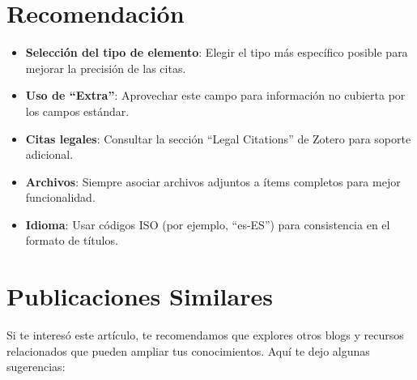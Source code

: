\documentclass[
  jou,
  floatsintext,
  longtable,
  a4paper,
  nolmodern,
  notxfonts,
  notimes,
  12pt,
  colorlinks=true,linkcolor=blue,citecolor=blue,urlcolor=blue]{apa7}
\providecommand{\tightlist}{%
  \setlength{\itemsep}{0pt}\setlength{\parskip}{0pt}}
\begin{document}
\section{Recomendación}\label{recomendaciuxf3n}

\begin{itemize}
\tightlist
\item
  \textbf{Selección del tipo de elemento}: Elegir el tipo más específico
  posible para mejorar la precisión de las citas.
\item
  \textbf{Uso de ``Extra''}: Aprovechar este campo para información no
  cubierta por los campos estándar.
\item
  \textbf{Citas legales}: Consultar la sección ``Legal Citations'' de
  Zotero para soporte adicional.
\item
  \textbf{Archivos}: Siempre asociar archivos adjuntos a ítems completos
  para mejor funcionalidad.
\item
  \textbf{Idioma}: Usar códigos ISO (por ejemplo, ``es-ES'') para
  consistencia en el formato de títulos.
\end{itemize}

\section{Publicaciones Similares}\label{publicaciones-similares}

Si te interesó este artículo, te recomendamos que explores otros blogs y
recursos relacionados que pueden ampliar tus conocimientos. Aquí te dejo
algunas sugerencias:
\end{document}
